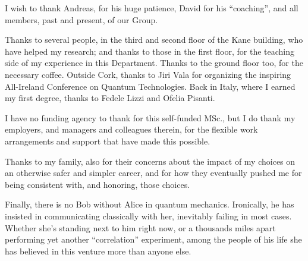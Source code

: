 I wish to thank Andreas, for his huge patience, David for
his ``coaching'',
and all members, past and present, of our Group.

Thanks to several people, in the third and second floor of the Kane building,
who have helped my research; and thanks to those in the first floor,
for the teaching side of my experience in this Department.
Thanks to the ground floor too, for the necessary coffee.
Outside Cork, thanks to Jiri Vala
for organizing the inspiring All-Ireland Conference on Quantum Technologies.
Back in Italy, where I earned my first degree, thanks to Fedele Lizzi and Ofelia Pisanti.

I have no funding agency to thank for this self-funded MSc.,
but I do thank my employers, and managers and colleagues therein,
for the flexible work arrangements and support that have made this possible.

Thanks to my family, also for their concerns about the impact of my choices on an otherwise safer and simpler career,
and for how they eventually pushed me for being consistent with, and honoring, those choices.

Finally, there is no Bob without Alice in quantum mechanics.
Ironically, he has insisted in communicating classically with her,
inevitably failing in most cases.
Whether she's standing next to him right now,
or a thousands miles apart performing yet another ``correlation'' experiment,
among the people of his life
she has believed in this venture more than anyone else.
